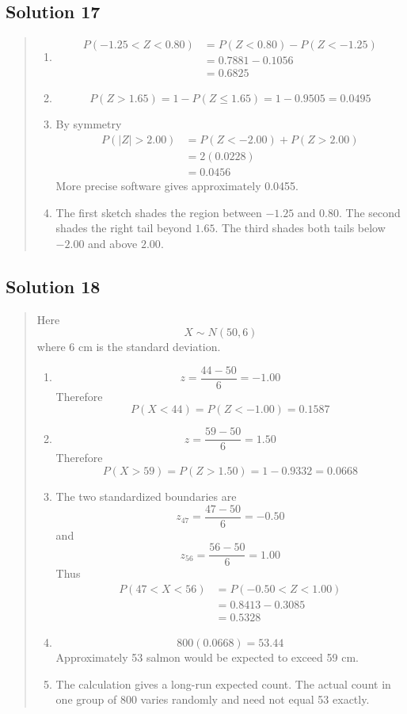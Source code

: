 \documentclass[10pt,letterpaper]{article}
\newcommand{\solutionheading}[1]{%
  \subsection*{Solution #1}
}
\newenvironment{answer}{%
  \begin{quote}\small\color{black}
}{%
  \end{quote}
}
\begin{document}
\solutionheading{17}
\begin{answer}
\begin{enumerate}
	\item
	$$
	\begin{aligned}
	P(-1.25<Z<0.80)
	&=P(Z<0.80)-P(Z<-1.25)\\
	&=0.7881-0.1056\\
	&=0.6825
	\end{aligned}
	$$
  	\item
	$$P(Z>1.65)=1-P(Z\leq1.65)=1-0.9505=0.0495$$
  	\item By symmetry
	$$
	\begin{aligned}
  	P(|Z|>2.00)
 	&=P(Z<-2.00)+P(Z>2.00)\\
  	&=2(0.0228)\\
  	&=0.0456
  	\end{aligned}
	$$
 	More precise software gives approximately 0.0455.
	\item The first sketch shades the region between $-1.25$ and $0.80$. The second shades the right tail beyond $1.65$. The third shades both tails below $-2.00$ and above $2.00$.
\end{enumerate}
\end{answer}

\solutionheading{18}
\begin{answer}
Here
$$X\sim N(50,6)$$
where 6 cm is the standard deviation.
\begin{enumerate}
	\item
	$$z=\frac{44-50}{6}=-1.00$$
	Therefore
	$$P(X<44)=P(Z<-1.00)=0.1587$$
  	\item
	$$z=\frac{59-50}{6}=1.50$$
 	 Therefore
	$$P(X>59)=P(Z>1.50)=1-0.9332=0.0668$$
  	\item The two standardized boundaries are
	$$z_{47}=\frac{47-50}{6}=-0.50$$
  	and
	$$z_{56}=\frac{56-50}{6}=1.00$$
  	Thus
	$$
  	\begin{aligned}
  	P(47<X<56)
  	&=P(-0.50<Z<1.00)\\
  	&=0.8413-0.3085\\
  	&=0.5328
  	\end{aligned}
	$$
  	\item
	$$800(0.0668)=53.44$$
 	Approximately 53 salmon would be expected to exceed 59 cm.
	\item The calculation gives a long-run expected count. The actual count in one group of 800 varies randomly and need not equal 53 exactly.
\end{enumerate}
\end{answer}
\end{document}
